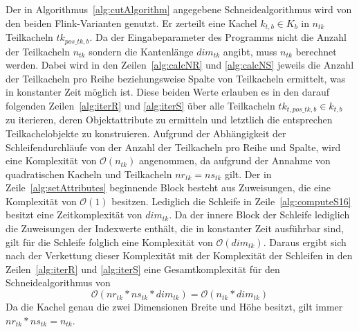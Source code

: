 Der in Algorithmus~\ref{alg:cutAlgorithm} angegebene Schneidealgorithmus wird von den beiden Flink-Varianten genutzt. Er zerteilt eine Kachel $k_{t, b} \in K_{b}$ in $n_{tk}$ Teilkacheln $tk_{pos\_tk, b}$. Da der Eingabeparameter des Programms nicht die Anzahl der Teilkacheln $n_{tk}$ sondern die Kantenlänge $dim_{tk}$ angibt, muss $n_{tk}$ berechnet werden. Dabei wird in den Zeilen~\ref{alg:calcNR} und \ref{alg:calcNS} jeweils die Anzahl der Teilkacheln pro Reihe beziehungsweise Spalte von Teilkacheln ermittelt, was in konstanter Zeit möglich ist. Diese beiden Werte erlauben es in den darauf folgenden Zeilen~\ref{alg:iterR} und \ref{alg:iterS} über alle Teilkacheln $tk_{t, pos\_tk, b} \in k_{t, b}$ zu iterieren, deren Objektattribute zu ermitteln und letztlich die entsprechen Teilkachelobjekte zu konstruieren. Aufgrund der Abhängigkeit der Schleifendurchläufe von der Anzahl der Teilkacheln pro Reihe und Spalte, wird eine Komplexität von $\mathcal{O}(n_{tk})$ angenommen, da aufgrund der Annahme von quadratischen Kacheln und Teilkacheln $nr_{tk} = ns_{tk}$ gilt. Der in Zeile~\ref{alg:setAttributes} beginnende Block besteht aus Zuweisungen, die eine Komplexität von $\mathcal{O}(1)$ besitzen. Lediglich die Schleife in Zeile~\ref{alg:computeS16} besitzt eine Zeitkomplexität von $dim_{tk}$. Da der innere Block der Schleife lediglich die Zuweisungen der Indexwerte enthält, die in konstanter Zeit ausführbar sind, gilt für die Schleife folglich eine Komplexität von $\mathcal{O}(dim_{tk})$. Daraus ergibt sich nach der Verkettung dieser Komplexität mit der Komplexität der Schleifen in den Zeilen~\ref{alg:iterR} und \ref{alg:iterS} eine Gesamtkomplexität für den Schneidealgorithmus von 
%
\begin{equation} \label{eq:complexityCut}
\mathcal{O}(nr_{tk} * ns_{tk} * dim_{tk}) = \mathcal{O}(n_{tk} * dim_{tk})
\end{equation}
%
Da die Kachel genau die zwei Dimensionen Breite und Höhe besitzt, gilt immer $nr_{tk} * ns_{tk} = n_{tk}$. 


